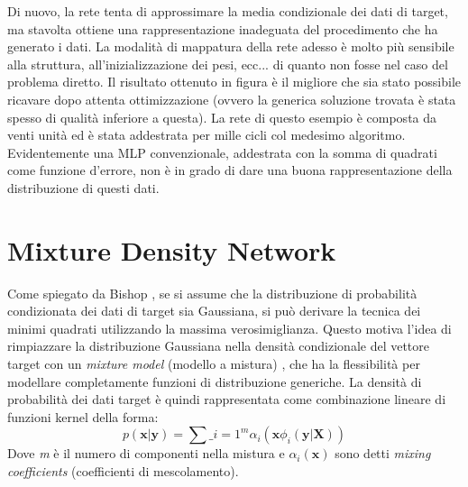 Di nuovo, la rete tenta di approssimare la media condizionale dei dati di target, ma stavolta ottiene una rappresentazione inadeguata del procedimento che ha generato i dati. La modalità di mappatura della rete adesso è molto più sensibile alla struttura, all'inizializzazione dei pesi, ecc... di quanto non fosse nel caso del problema diretto. Il risultato ottenuto in figura è il migliore che sia stato possibile ricavare dopo attenta ottimizzazione (ovvero la generica soluzione trovata è stata spesso di qualità inferiore a questa). La rete di questo esempio è composta da venti unità ed è stata addestrata per mille cicli col medesimo algoritmo. Evidentemente una MLP convenzionale, addestrata con la somma di quadrati come funzione d'errore, non è in grado di dare una buona rappresentazione della distribuzione di questi dati.
\section{Mixture Density Network} %
\label{sec:mdn}
Come spiegato da Bishop \cite{gmm}, se si assume che la distribuzione di probabilità condizionata dei dati di target sia Gaussiana, si può derivare la tecnica dei minimi quadrati utilizzando la massima verosimiglianza. Questo motiva l'idea di rimpiazzare la distribuzione Gaussiana nella densità condizionale del vettore target con un \textit{mixture model} (modello a mistura) \cite{mixture}, che ha la flessibilità per modellare completamente funzioni di distribuzione generiche. La densità di probabilità dei dati target è quindi rappresentata come combinazione lineare di funzioni kernel della forma:
\begin{equation}
	\label{density}
	p(\boldsymbol{x} | \boldsymbol{y}) = \sum\_{i=1}^m \alpha_i(\boldsymbol{x}\phi_i(\boldsymbol{y} | \boldsymbol{X}))
\end{equation}
Dove \textit{m} è il numero di componenti nella mistura e $\alpha_i(\boldsymbol{x})$ sono detti \textit{mixing coefficients} (coefficienti di mescolamento).

